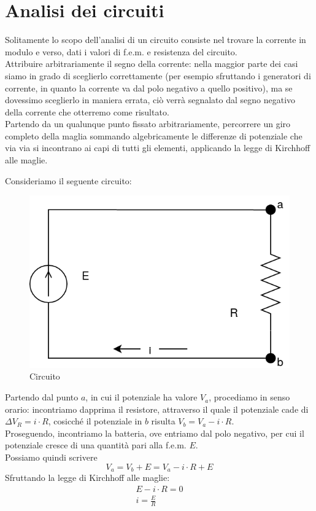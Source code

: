 \section{Analisi dei circuiti}
Solitamente lo scopo dell'analisi di un circuito consiste nel trovare la corrente in modulo e verso, dati i valori di f.e.m. e resistenza del circuito.\\
Attribuire arbitrariamente il segno della corrente: nella maggior parte dei casi siamo in grado di sceglierlo correttamente (per esempio sfruttando i generatori di corrente, in quanto la corrente va dal polo negativo a quello positivo), ma se dovessimo sceglierlo in maniera errata, ciò verrà segnalato dal segno negativo della corrente che otterremo come risultato.\\
Partendo da un qualunque punto fissato arbitrariamente, percorrere un giro completo della maglia sommando algebricamente le differenze di potenziale che via via si incontrano ai capi di tutti gli elementi, applicando la legge di Kirchhoff alle maglie.
\begin{esempio}
	Consideriamo il seguente circuito:
	\begin{figure}[h!]
		\centering
		\includegraphics[scale=0.4]{circuito}
		\caption{Circuito}
	\end{figure}
	Partendo dal punto $a$, in cui il potenziale ha valore $V_a$, procediamo in senso orario: incontriamo dapprima il resistore, attraverso il quale il potenziale cade di $\Delta V_R = i\cdot R$, cosicché il potenziale in $b$ risulta $V_b = V_a - i\cdot R$.\\
	Proseguendo, incontriamo la batteria, ove entriamo dal polo negativo, per cui il potenziale cresce di una quantità pari alla f.e.m. $E$.\\
	Possiamo quindi scrivere
	\begin{displaymath}
		V_a = V_b + E = V_a - i \cdot R + E
	\end{displaymath}
	Sfruttando la legge di Kirchhoff alle maglie:
	\begin{displaymath}\begin{aligned}
		E - i \cdot R = 0\\
		i = \frac{E}{R}
	\end{aligned}\end{displaymath}
\end{esempio}

